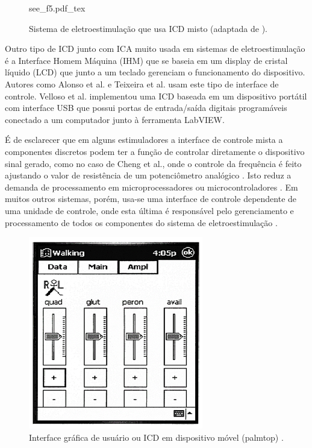 \vspace{0.3cm}
\begin{figure}[h]
    \centering %
    \small %
    \def\svgwidth{0.6
    \columnwidth}%
    {see_f5.pdf_tex}
    \caption{Sistema de eletroestimulação que usa ICD misto (adaptada de  \cite{Bijak2002TheParaplegia}).}
    \label{fig:see_f5}
\end{figure}

Outro tipo de \acrshort{ICD} junto com \acrshort{ICA} muito usada em sistemas de eletroestimulação é a Interface Homem Máquina (\acrshort{IHM}) que se baseia em um display de cristal líquido (\acrshort{LCD}) que junto a um teclado gerenciam o funcionamento do dispositivo. Autores como Alonso et al. \cite{Alonso2007DesignEffects} e Teixeira et al. \cite{Teixeira1998SistemaMicrocontrolado} usam este tipo de interface de controle. Velloso et al. \cite{Velloso2007AFES} implementou uma \acrshort{ICD} baseada em um dispositivo portátil com interface USB que possui portas de entrada/saída digitais programáveis conectado a um computador junto à ferramenta LabVIEW. 

É de esclarecer que em alguns estimuladores a interface de controle mista a componentes discretos podem ter a função de controlar diretamente o dispositivo sinal gerado, como no caso de Cheng et al., onde o controle da frequência é feito ajustando o valor de resistência de um potenciômetro analógico \cite{Cheng2004DevelopmentStimulation}. Isto reduz a demanda de processamento em microprocessadores ou microcontroladores \cite{Gaiotto2012EstimuladorEletricamente}. Em muitos outros sistemas, porém, usa-se uma interface de controle dependente de uma unidade de controle, onde esta última é responsável pelo gerenciamento e processamento de todos os componentes do sistema de eletroestimulação \cite{ Wu2002AApplications, Popovic2004CompexApplications, Souza2017PowerSystems,Bijak2002TheParaplegia, Martins2008DeselvolvimentoArbitraria}. 

\begin{figure}
    \centering %
    \includegraphics[width=0.35\linewidth]{figs/Fig_c3/icd_f6}
    \caption{Interface gráfica de usuário ou \acrshort{ICD} em dispositivo móvel (palmtop)  \cite{Bijak2002TheParaplegia}.}
    \label{fig:icd_f6}
\end{figure}

